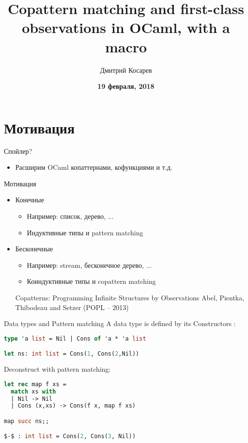 \documentclass[10pt, mathserif]{beamer}
\title{Copattern matching and first-class observations in OCaml, with a macro}
\author{Дмитрий Косарев}
\date{
  \vskip 2cm
  \small{
    \textbf{19 февраля, 2018}
  }
}
\theoremstyle{definition}
\begin{document}
\begin{frame}
  \titlepage
\end{frame}


\section{Мотивация}

\begin{frame}{Спойлер?}
\begin{itemize}
 \item Расширим OCaml копаттернами, кофункциями и т.д.
\end{itemize}

\end{frame}

\begin{frame}{Мотивация}
 
\begin{itemize}
  \item Конечные
  \begin{itemize}
    \item Например: список, дерево, ...
    \item Индуктивные типы и pattern matching
  \end{itemize}
  \item Бесконечные
  \begin{itemize}
    \item Например: stream, бесконечное дерево, ...
    \item Коиндуктивные типы и copattern matching
  \end{itemize}
  \vspace{1in}
  \pause
  Copatterns: Programming Infinite Structures by Observations
  Abel, Pientka, Thibodeau and Setzer (POPL – 2013)
\end{itemize}

\end{frame}

\begin{frame}[fragile]{Data types and Pattern matching}
A data type is defined by its Constructors :

\begin{lstlisting}[language=ocaml,mathescape=true]
type 'a list = Nil | Cons of 'a * 'a list

let ns: int list = Cons(1, Cons(2,Nil))
\end{lstlisting}
Deconstruct with pattern matching:
\begin{lstlisting}[language=ocaml,mathescape=true]
let rec map f xs =
  match xs with
  | Nil -> Nil
  | Cons (x,xs) -> Cons(f x, map f xs)

map succ ns;;

$-$ : int list = Cons(2, Cons(3, Nil))
\end{lstlisting}
\end{frame}
\end{document}
